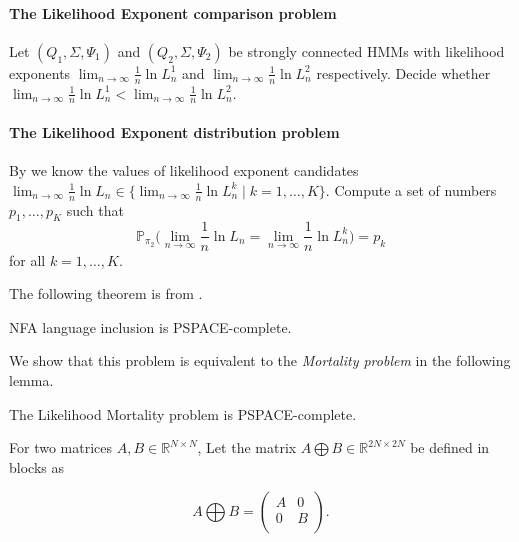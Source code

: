 \documentclass[a4paper,UKenglish,cleveref, autoref,mathscr]{lipics-v2019}
\newcommand{\RR}{\mathbb{R}}
\newcommand{\PP}{\mathbb{P}}
\newcommand{\1}{\mathbbm{1}}
\newcommand{\liexp}{\lim_{n\rightarrow\infty} \frac1n \ln L_n}
\begin{document}
\paragraph*{The Likelihood Exponent comparison problem\\}
Let $(Q_1, \Sigma, \Psi_1)$ and $(Q_2, \Sigma, \Psi_2)$ be strongly connected HMMs with likelihood exponents $\liexp^1$ and $\liexp^2$ respectively. Decide whether $\liexp^1 < \liexp^2$.

\paragraph*{The Likelihood Exponent distribution problem\\}
By  we know the values of likelihood exponent candidates $\liexp \in \{\liexp^k \mid k = 1, \dots, K\}$. Compute a set of numbers $p_1, \dots, p_K$ such that 
\begin{equation*}
\PP_{\pi_2}\Big(\liexp = \liexp^k \Big) = p_k
\end{equation*}
for all $k = 1, \dots, K$.

The following theorem is from \cite{kupvar98}.
\begin{theorem}
NFA language inclusion is PSPACE-complete.
\end{theorem}

We show that this problem is equivalent to the \emph{Mortality problem} in the following lemma.

\begin{lemma}\label{mortalpspace}
The Likelihood Mortality problem is PSPACE-complete. 
\end{lemma}

For two matrices $A, B \in \RR^{N \times N}$, Let the matrix $A \bigoplus B \in \RR^{2N \times 2N}$ be defined in blocks as

\begin{equation*}
A \bigoplus B = \begin{pmatrix}
A & 0 \\
0 & B \\
\end{pmatrix}.
\end{equation*}
\end{document}
